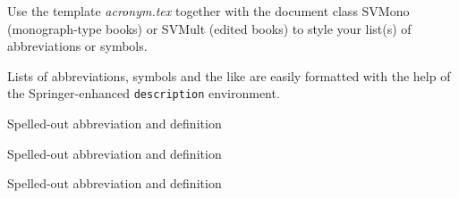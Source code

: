 %
%


Use the template \emph{acronym.tex} together with the document class SVMono (monograph-type books) or SVMult (edited books) to style your list(s) of abbreviations or symbols.

Lists of abbreviations, symbols and the like are easily formatted with the help of the Springer-enhanced \verb|description| environment.

\begin{description}[CABR]
\item[ABC]{Spelled-out abbreviation and definition}
\item[BABI]{Spelled-out abbreviation and definition}
\item[CABR]{Spelled-out abbreviation and definition}
\end{description}